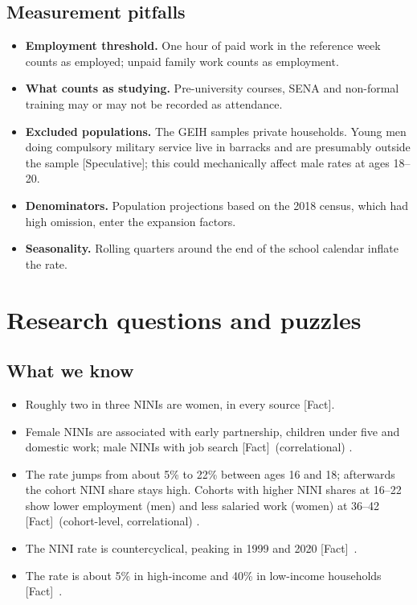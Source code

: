 \documentclass[11pt]{article}
\newcommand{\fact}{\textcolor{green!45!black}{\textsf{\footnotesize[Fact]}}}
\newcommand{\spec}{\textcolor{red!70!black}{\textsf{\footnotesize[Speculative]}}}
\begin{document}
\subsection{Measurement pitfalls}

\begin{itemize}
\item \textbf{Employment threshold.} One hour of paid work in the reference week counts as employed; unpaid family work counts as employment.
\item \textbf{What counts as studying.} Pre-university courses, SENA and non-formal training may or may not be recorded as attendance.
\item \textbf{Excluded populations.} The GEIH samples private households. Young men doing compulsory military service live in barracks and are presumably outside the sample \spec; this could mechanically affect male rates at ages 18--20.
\item \textbf{Denominators.} Population projections based on the 2018 census, which had high omission, enter the expansion factors.
\item \textbf{Seasonality.} Rolling quarters around the end of the school calendar inflate the rate.
\end{itemize}

\section{Research questions and puzzles}\label{sec:questions}

\subsection{What we know}

\begin{itemize}
\item Roughly two in three NINIs are women, in every source \fact.
\item Female NINIs are associated with early partnership, children under five and domestic work; male NINIs with job search \fact\ (correlational) \citep{ochoa2015,lopez2020,lenis2021}.
\item The rate jumps from about 5\% to 22\% between ages 16 and 18; afterwards the cohort NINI share stays high. Cohorts with higher NINI shares at 16--22 show lower employment (men) and less salaried work (women) at 36--42 \fact\ (cohort-level, correlational) \citep{lasso2026}.
\item The NINI rate is countercyclical, peaking in 1999 and 2020 \fact\ \citep{lasso2026}.
\item The rate is about 5\% in high-income and 40\% in low-income households \fact\ \citep{lasso2026}.
\end{itemize}
\end{document}
